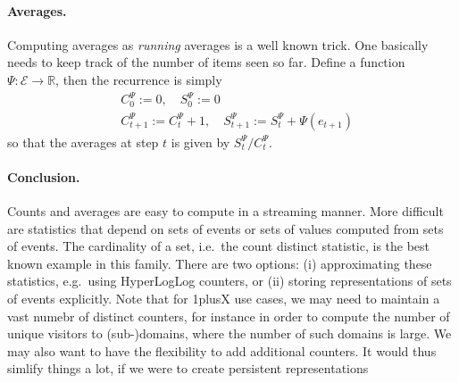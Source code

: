 \documentclass{article}
\renewcommand{\Re}{{\mathbb R}}
\begin{document}
\paragraph{Averages.} Computing averages as \textit{running} averages is a well known trick. One basically needs to keep track of the number of items seen so far. Define a function $\Psi: \mathcal{E} \to \Re$, then the recurrence is simply 
\begin{align}
& C^\Psi_0 := 0, \quad S^\Psi_0 := 0 \\ 
& C^\Psi_{t+1} := C^\Psi_t +1, \quad S^\Psi_{t+1} := S^\Psi_{t}  + \Psi(e_{t+1})
\end{align}
so that the averages at step $t$ is given by $S^\Psi_t / C^\Psi_t$. 

\paragraph{Conclusion.}  Counts and averages are easy to compute in a streaming manner. More difficult are statistics that depend on sets of events or sets of values computed from sets of events. The cardinality of a set, i.e.~the count distinct statistic, is the best known example in this family. There are two options: (i) approximating these statistics, e.g.~using HyperLogLog counters, or (ii) storing representations of sets of events explicitly. Note that for 1plusX use cases, we may need to maintain a vast numebr of distinct counters, for instance in order to compute the number of unique visitors to (sub-)domains, where the number of such domains is large. We may also want to have the flexibility to add additional counters. It would thus simlify things a lot, if we were to create persistent representations 

 

\newpage





\end{document}
